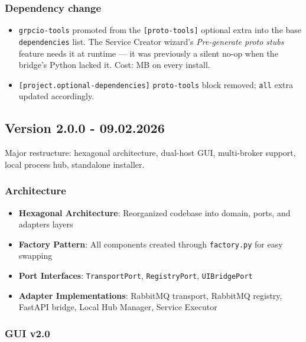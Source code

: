 \subsubsection{Dependency change}

\begin{itemize}
   \item \texttt{grpcio-tools} promoted from the \texttt{[proto-tools]}
         optional extra into the base \texttt{dependencies} list.  The
         Service Creator wizard's \emph{Pre-generate proto stubs} feature
         needs it at runtime --- it was previously a silent no-op when the
         bridge's Python lacked it.  Cost:  MB on every install.
   \item \texttt{[project.optional-dependencies]} \texttt{proto-tools}
         block removed; \texttt{all} extra updated accordingly.
\end{itemize}

\subsection{Version 2.0.0 - 09.02.2026}

Major restructure: hexagonal architecture, dual-host GUI, multi-broker support,
local process hub, standalone installer.

\subsubsection{Architecture}

\begin{itemize}
   \item \textbf{Hexagonal Architecture}: Reorganized codebase into domain, ports, and adapters layers
   \item \textbf{Factory Pattern}: All components created through \texttt{factory.py} for easy swapping
   \item \textbf{Port Interfaces}: \texttt{TransportPort}, \texttt{RegistryPort}, \texttt{UIBridgePort}
   \item \textbf{Adapter Implementations}: RabbitMQ transport, RabbitMQ registry, FastAPI bridge,
         Local Hub Manager, Service Executor
\end{itemize}

\subsubsection{GUI v2.0}

